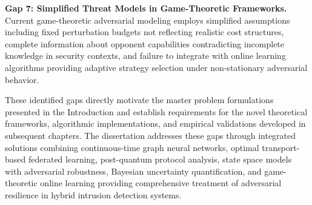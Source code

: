 \textbf{Gap 7: Simplified Threat Models in Game-Theoretic Frameworks.} Current game-theoretic adversarial modeling employs simplified assumptions including fixed perturbation budgets not reflecting realistic cost structures, complete information about opponent capabilities contradicting incomplete knowledge in security contexts, and failure to integrate with online learning algorithms providing adaptive strategy selection under non-stationary adversarial behavior.

These identified gaps directly motivate the master problem formulations presented in the Introduction and establish requirements for the novel theoretical frameworks, algorithmic implementations, and empirical validations developed in subsequent chapters. The dissertation addresses these gaps through integrated solutions combining continuous-time graph neural networks, optimal transport-based federated learning, post-quantum protocol analysis, state space models with adversarial robustness, Bayesian uncertainty quantification, and game-theoretic online learning providing comprehensive treatment of adversarial resilience in hybrid intrusion detection systems.
